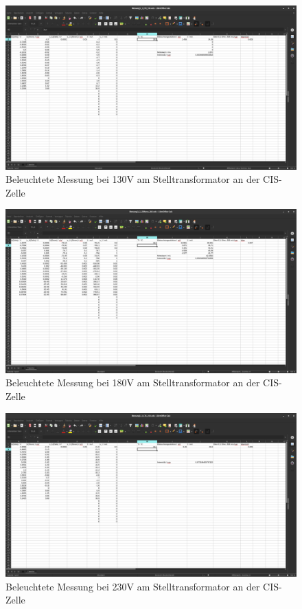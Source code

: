 \begin{figure}[h]
    \captionsetup{justification=centering,margin=2cm}
    \centering
    \includegraphics[angle = 90, width = 12cm]{Bilder/Daten/MessunngCIS130.png}
    \caption{Beleuchtete Messung bei 130V am Stelltransformator an der CIS-Zelle}
\end{figure}


\begin{figure}[h]
    \captionsetup{justification=centering,margin=2cm}
    \centering
    \includegraphics[angle = 90, width = 12cm]{Bilder/Daten/MessunngMonoSi180.png}
    \caption{Beleuchtete Messung bei 180V am Stelltransformator an der CIS-Zelle}
\end{figure}


\begin{figure}[h]
    \captionsetup{justification=centering,margin=2cm}
    \centering
    \includegraphics[angle = 90, width = 12cm]{Bilder/Daten/MessunngCIS230.png}
    \caption{Beleuchtete Messung bei 230V am Stelltransformator an der CIS-Zelle}
\end{figure}
